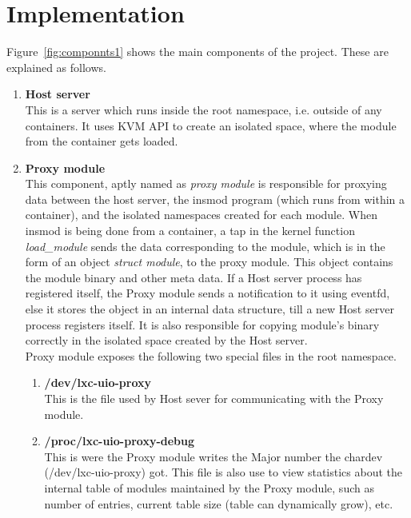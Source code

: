 \documentclass[twoside]{iitbreport}
\begin{document}
\chapter{Implementation\label{ch:implementation}}
Figure~\ref{fig:componnts1} shows the main components of the project. These are explained as follows.

\begin{enumerate}
\item \textbf{Host server}\\
This is a server which runs inside the root namespace, i.e. outside of any containers. It uses KVM API to create an isolated space, where the module from the container gets loaded.
\item \textbf{Proxy module}\\
This component, aptly named as \textit{proxy module} is responsible for proxying data between the host server, the insmod program (which runs from within a container), and the isolated namespaces created for each module.
When insmod is being done from a container, a tap in the kernel function \textit{load\_module} sends the data corresponding to the module, which is in the form of an object \textit{struct module}, to the proxy module. This object contains the module binary and other meta data. If a Host server process has registered itself, the Proxy module sends a notification to it using eventfd, else it stores the object in an internal data structure, till a new Host server process registers itself. It is also responsible for copying module's binary correctly in the isolated space created by the Host server.
\\
Proxy module exposes the following two special files in the root namespace.
\begin{enumerate}
\item \textbf{/dev/lxc-uio-proxy}\\
This is the file used by Host sever for communicating with the Proxy module.
\item \textbf{/proc/lxc-uio-proxy-debug}\\
This is were the Proxy module writes the Major number the chardev (/dev/lxc-uio-proxy) got. This file is also use to view statistics about the internal table of modules maintained by the Proxy module, such as number of entries, current table size (table can dynamically grow), etc.
\end{enumerate}


\end{enumerate}
\end{document}
